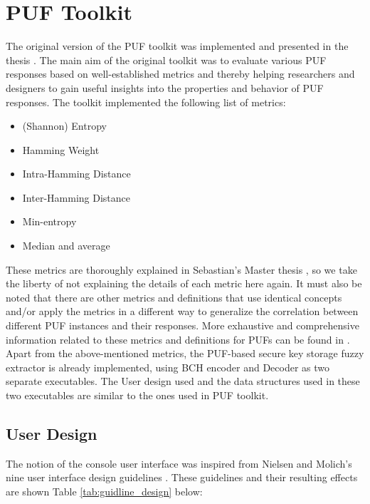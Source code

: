 \section{PUF Toolkit}
The original version of the PUF toolkit was implemented and presented in the thesis \cite{71}. The main aim of the original toolkit was to evaluate various PUF responses based on well-established metrics and thereby helping researchers and designers to gain useful insights into the properties and behavior of PUF responses. The toolkit implemented the following list of metrics:

\begin{itemize}
	\item (Shannon) Entropy
	\item Hamming Weight
	\item Intra-Hamming Distance
	\item Inter-Hamming Distance
	\item Min-entropy
	\item Median and average
\end{itemize}

These metrics are thoroughly explained in Sebastian's Master thesis \cite{71}, so we take the liberty of not explaining the details of each metric here again. It must also be noted that there are other metrics and definitions that use identical concepts and/or apply the metrics in a different way to generalize the correlation between different PUF instances and their responses. More exhaustive and comprehensive information related to these metrics and definitions for PUFs can be found in \cite{60,64,24,61}.\\

Apart from the above-mentioned metrics, the PUF-based secure key storage fuzzy extractor is already implemented, using BCH encoder and Decoder as two separate executables. The User design used and the data structures used in these two executables are similar to the ones used in PUF toolkit.\\

\subsection{User Design}

The notion of the console user interface was inspired from Nielsen and Molich's nine user interface design guidelines \cite{67}. These guidelines and their resulting effects are shown Table \ref{tab:guidline_design} below:

